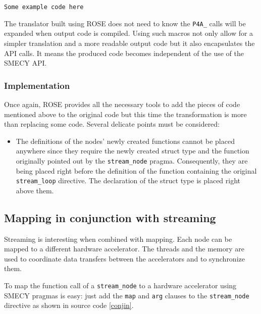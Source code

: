 \documentclass[a4paper]{article}
\begin{document}
	\begin{lstlisting}[label=streamoutput,caption={}]
	Some example code here
	\end{lstlisting}
	
	The translator built using ROSE does not need to know the \verb+P4A_+ calls will be expanded when output code is compiled. Using such macros not only allow for a simpler translation and a more readable output code but it also encapsulates the API calls. It means the produced code becomes independent of the use of the SMECY API.
	
	\subsubsection{Implementation} Once again, ROSE provides all the necessary tools to add the pieces of code mentioned above to the original code but this time the transformation is more than replacing some code. Several delicate points must be considered:
	\begin{itemize}
		\item The definitions of the nodes' newly created functions cannot be placed anywhere since they require the newly created struct type and the function originally pointed out by the \verb+stream_node+ pragma. Consequently, they are being placed right before the definition of the function containing the original \verb+stream_loop+ directive. The declaration of the struct type is placed right above them.
	\end{itemize}
	
	
	
	\subsection{Mapping in conjunction with streaming}
	Streaming is interesting when combined with mapping. Each node can be mapped to a different hardware accelerator. The threads and the memory are used to coordinate data transfers between the accelerators and to synchronize them.
	
	To map the function call of a \verb+stream_node+ to a hardware accelerator using SMECY pragmas is easy: just add the \verb+map+ and \verb+arg+ clauses to the \verb+stream_node+ directive as shown in source code \ref{conjin}.
		
\end{document}
